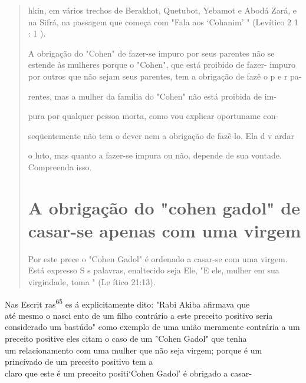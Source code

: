 \begin{quote}hkin, em vários trechos de Berakhot, Quetubot, Yebamot e Abodá Zará, e
na Sifrá, na passagem que começa com "Fala aos `Cohanim' " (Levítico 2 1
: 1 ).

A obrigação do "Cohen" de fazer-se impuro por seus parentes não se
estende às mulheres porque o "Cohen", que está proibido de fazer-
impu­ro por outros que não sejam seus parentes, tem a obrigação de fazê
o p e r pa-

rentes, mas a mulher da família do "Cohen" não está proibida de im-

pura por qualquer pessoa morta, como vou explicar oportuname con-

seqüentemente não tem o dever nem a obrigação de fazê-lo. Ela d v ardar

o luto, mas quanto a fazer-se impura ou não, depende de sua vontade.
Com­preenda isso.

\section{A obrigação do "cohen gadol" de casar-se apenas com uma virgem}

Por este prece o "Cohen Gadol" é ordenado a casar-se com uma virgem.
Está expresso S s palavras, enaltecido seja Ele, "E ele, mulher em sua
virgindade, toma " (Le ítico 21:13).
\end{quote}

Nas Escrit ras\textsuperscript{65} es á explicitamente dito: "Rabi Akiba
afirmava que\\
até mesmo o nasci ento de um filho contrário a este preceito positivo
seria\\
considerado um bastúdo" como exemplo de uma união meramente contrária
a um preceito positive eles citam o caso de um "Cohen Gadol" que
tenha\\
um relacionamento com uma mulher que não seja virgem; porque é um
princívado
de um preceito positivo tem a\\
claro que este é um preceito positi`Cohen
Gadol' é obrigado a casar-


